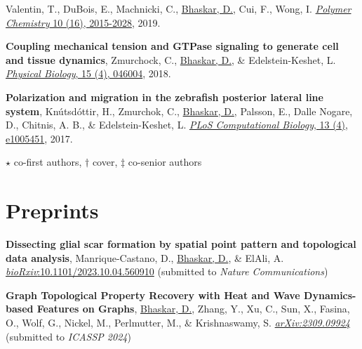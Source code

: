 \documentclass[margin,line]{res}
\begin{document}
\begin{resume}
{\begin{etaremune}[start=14]
Valentin, T., DuBois, E., Machnicki, C., \underline{Bhaskar, D.}, Cui, F., Wong, I. 
\href{https://pubs.rsc.org/ko/content/articlehtml/2019/py/c9py00211a}{\textit{Polymer Chemistry} 10 (16), 2015-2028}, 2019.
\vspace*{.1cm}
\item{\bf Coupling mechanical tension and GTPase signaling to generate cell and tissue dynamics}, 
Zmurchock, C., \underline{Bhaskar, D.}, \& Edelstein-Keshet, L. 
\href{https://iopscience.iop.org/article/10.1088/1478-3975/aab1c0/meta}{\textit{Physical Biology}, 15 (4), 046004}, 2018.
\vspace*{.1cm}
\item{\bf Polarization and migration in the zebrafish posterior lateral line system}, 
Kn\'{u}tsd\'{o}ttir, H., Zmurchok, C., \underline{Bhaskar, D.}, Palsson, E., Dalle Nogare, D., Chitnis, A. B., \& Edelstein-Keshet, L. 
\href{https://journals.plos.org/ploscompbiol/article?id=10.1371/journal.pcbi.1005451&rev=2}{\textit{PLoS Computational Biology}, 13 (4), e1005451}, 2017.
\item[] $\star$ co-first authors, $\dagger$ cover, $\ddagger$ co-senior authors
\end{etaremune}
}

\vspace*{.15cm}

\section{\sc Preprints}
{
\renewcommand\leftmargini{0em}
\renewcommand{\labelenumi}{P\theenumi}
\begin{etaremune}[start=6]
\item{\bf Dissecting glial scar formation by spatial point pattern and topological data analysis},
Manrique-Castano, D., \underline{Bhaskar, D.}, \& ElAli, A. 
\href{https://doi.org/10.1101/2023.10.04.560910}{\textit{bioRxiv}:10.1101/2023.10.04.560910} (submitted to \textit{Nature Communications})
\vspace*{.1cm}
\item{\bf Graph Topological Property Recovery with Heat and Wave Dynamics-based Features on Graphs},
\underline{Bhaskar, D.}, Zhang, Y., Xu, C., Sun, X., Fasina, O., Wolf, G., Nickel, M., Perlmutter, M., \& Krishnaswamy, S. 
\href{https://arxiv.org/abs/2309.09924}{\textit{arXiv:2309.09924}} (submitted to \textit{ICASSP 2024})
\end{etaremune}
}

%



\end{resume}
\end{document}
